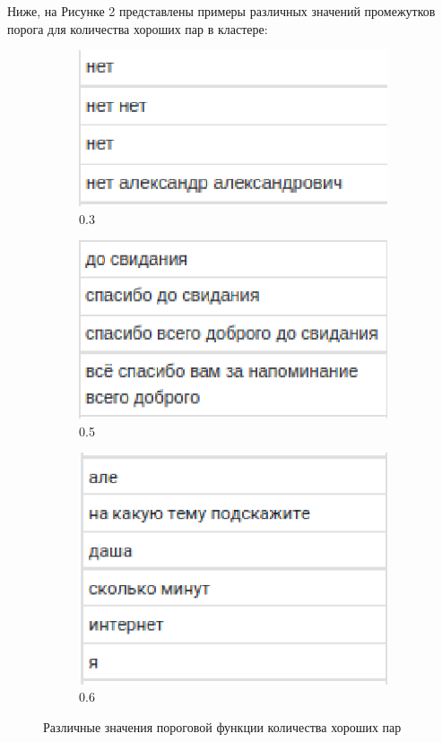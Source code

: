 \documentclass[specification,annotation]{itmo-student-thesis}
\begin{document}
	Ниже, на Рисунке 2 представлены примеры различных значений промежутков порога для количества хороших пар в кластере:
	
	 \begin{figure}[H]
		\begin{subfigure}[c]{0.3\textwidth}
			\includegraphics[width=\textwidth]{Sample_0.3.eps}
			\caption{0.3}
		\end{subfigure}
		\begin{subfigure}[c]{0.3\textwidth}
			\includegraphics[width=\textwidth]{Sample_0.5.eps}
			\caption{0.5}
		\end{subfigure}
		\begin{subfigure}[c]{0.3\textwidth}
			\includegraphics[width=\textwidth]{Sample_0.6.eps}
			\caption{0.6}
		\end{subfigure}
		\caption{Различные значения пороговой функции количества хороших пар}
		\label{ris:image1}
	\end{figure}
	
\end{document}
